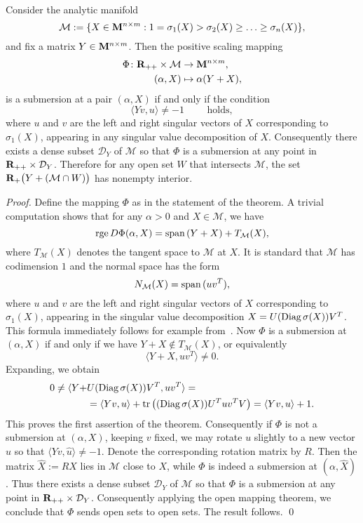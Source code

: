 \documentclass[smallextended,numbook]{svjour3}
\begin{document}
\begin{lem}\label{lem: con_spec} \hfill\hfill \\ 
Consider the analytic manifold
$$\mathcal{M}:=\{X \in {\bf M}^{n\times m}: 1=\sigma_1(X)> \sigma_2(X) \geq \ldots\geq \sigma_{n}(X)\},$$
and fix a matrix $Y\in  {\bf M}^{n\times m}$. Then the positive scaling mapping 
\begin{align*}
\Phi\colon {{\bf R}}_{++}\times \mathcal{M} &\to {\bf M}^{n\times m}, \\
(\alpha,X) &\mapsto \alpha (Y+X),
\end{align*}
is a submersion at a pair $(\alpha, X)$ if and only if the condition
$$\langle Yv, u\rangle \neq -1 \qquad\textrm{ holds},$$
where $u$ and $v$ are the left and  right singular vectors of $X$ corresponding to $\sigma_1(X)$, appearing in any singular value decomposition of $X$.
Consequently there exists a dense subset $\mathcal{D}_{Y}$ of $\mathcal{M}$ so that $\Phi$ is a submersion at any point in ${{\bf R}}_{++}\times\mathcal{D}_{Y}$. Therefore  
for any open set $W$ that intersects $\mathcal{M}$, the set ${{\bf R}}_+\big(Y+(\mathcal{M}\cap W)\big)$ has nonempty interior.
\end{lem}
\begin{proof}
Define the mapping $\Phi$ as in the statement of the theorem.
A trivial computation shows that for any $\alpha >0$ and $X\in \mathcal{M}$, we have 
$${\mbox{\rm rge}\,} D\Phi(\alpha,X)={\mbox{\rm span}\,}(Y+X) +T_{\mathcal{M}}(X),$$
where $T_{\mathcal{M}}(X)$ denotes the tangent space to $\mathcal{M}$ at $X$.
It is standard that $\mathcal{M}$ has codimension $1$ and the normal space has the form
$$N_{\mathcal{M}}(X)= {\mbox{\rm span}\,} (uv^{T}),$$ 
where $u$ and $v$ are the left and right singular vectors of $X$ corresponding to $\sigma_1(X)$, appearing in the singular value decomposition $X=U({\mbox{\rm Diag}\,}\sigma(X))V^T$. This formula immediately follows for example from~\cite[Theorem~7.1]{LHSing}.
Now $\Phi$ is a submersion at $(\alpha, X)$ if and only if we have $Y+X\notin T_{\mathcal{M}}(X)$, or equivalently
$$\langle Y+X, uv^{T}\rangle \neq 0.$$
Expanding, we obtain 
\begin{align*}
0\neq \langle Y+&U({\mbox{\rm Diag}\,}\sigma(X))V^T, uv^{T}\rangle= \\
&=\langle Yv,u\rangle +{\mbox{\rm tr}\,} \big(({\mbox{\rm Diag}\,}\sigma(X)) U^Tu v^TV\big) = \langle Yv, u\rangle +1. 
\end{align*}
This proves the first assertion of the theorem. Consequently if $\Phi$ is not a submersion at $(\alpha, X)$, keeping $v$ fixed, we may rotate $u$ slightly to a new vector $\hat{u}$ so that $\langle Yv, \hat{u}\rangle\neq -1$. Denote the corresponding rotation matrix by $R$. Then the matrix $\widehat{X}:= RX$ lies in $\mathcal{M}$ close to $X$, while $\Phi$ is indeed a submersion at $(\alpha, \widehat{X})$. 
Thus there exists a dense subset $\mathcal{D}_{Y}$ of $\mathcal{M}$ so that $\Phi$ is a submersion at any point in ${{\bf R}}_{++}\times\mathcal{D}_{Y}$. Consequently applying the open mapping theorem, we conclude that $\Phi$ sends open sets to open sets. The result follows.
\qed
\end{proof}
\end{document}
